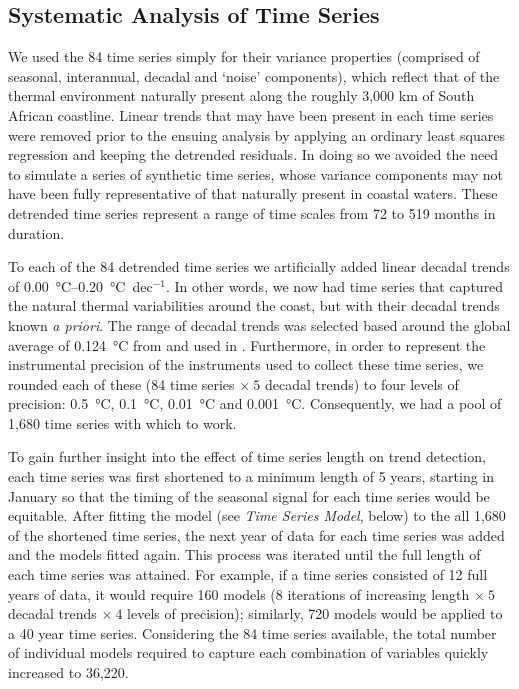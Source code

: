 \documentclass[]{ametsoc}
\begin{document}
\subsection{Systematic Analysis of Time Series}
We used the 84 time series simply for their variance properties (comprised of seasonal, interannual, decadal and ‘noise’ components), which reflect that of the thermal environment naturally present along the roughly 3,000 km of South African coastline. Linear trends that may have been present in each time series were removed prior to the ensuing analysis by applying an ordinary least squares regression and keeping the detrended residuals. In doing so we avoided the need to simulate a series of synthetic time series, whose variance components may not have been fully representative of that naturally present in coastal waters. These detrended time series represent a range of time scales from 72 to 519 months in duration.

To each of the 84 detrended time series we artificially added linear decadal trends of \SIrange{0.00}{0.20}{\degreeCelsius}~dec$^{-1}$. In other words, we now had time series that captured the natural thermal variabilities around the coast, but with their decadal trends known \emph{a priori}. The range of decadal trends was selected based around the global average of \SI{0.124}{\degreeCelsius} from \citet{Kennedy2011} and used in \citet{IPCC2013}. Furthermore, in order to represent the instrumental precision of the instruments used to collect these time series, we rounded each of these (84 time series $\times~5$ decadal trends) to four levels of precision: \SI{0.5}{\degreeCelsius}, \SI{0.1}{\degreeCelsius}, \SI{0.01}{\degreeCelsius} and \SI{0.001}{\degreeCelsius}. Consequently, we had a pool of 1,680 time series with which to work.

To gain further insight into the effect of time series length on trend detection, each time series was first shortened to a minimum length of 5 years, starting in January so that the timing of the seasonal signal for each time series would be equitable. After fitting the model (see \emph{Time Series Model}, below) to the all 1,680 of the shortened time series, the next year of data for each time series was added and the models fitted again. This process was iterated until the full length of each time series was attained. For example, if a time series consisted of 12 full years of data, it would require 160 models (8 iterations of increasing length $\times~5$ decadal trends $\times~4$ levels of precision); similarly, 720 models would be applied to a 40 year time series. Considering the 84 time series available, the total number of individual models required to capture each combination of variables quickly increased to 36,220.
\end{document}
